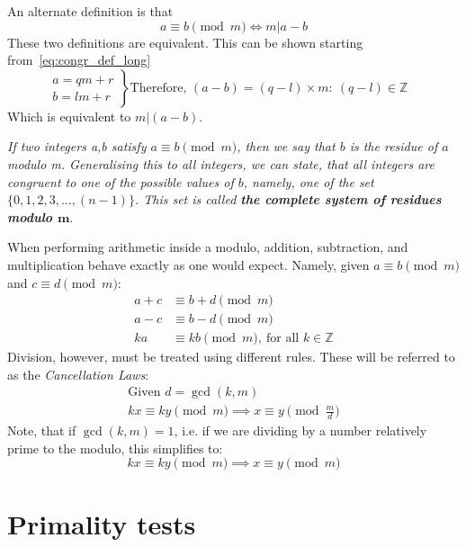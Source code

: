 \documentclass[12pt, titlepage]{article}
\let\oldsection\section
\renewcommand\section{\clearpage\oldsection}
\begin{document}
An alternate definition is that
%
\begin{equation*}
    a \equiv b \pmod{m} \iff m | a-b
\end{equation*}
%
These two definitions are equivalent. This can be shown starting
from~\eqref{eq:congr_def_long}
%
\begin{equation*}
    \left. 
        \begin{aligned}
            a = qm + r\\ 
            b = lm + r
        \end{aligned}
    \right\}
    \text{Therefore, } (a - b) = (q-l)\times m :\: (q-l) \in \mathbb{Z}\quad
\end{equation*}
%
Which is equivalent to $m | (a-b)$.

\textit{If two integers a,b satisfy $a \equiv b \pmod{m}$, then we say that $b$ is the residue of
$a$ modulo m. Generalising this to all integers, we can state, that all integers are
congruent to one of the possible values of $b$, namely, one of the set $\{0, 1, 2, 3, \ldots,
(n-1)\}$. This set is called \textbf{the complete system of residues modulo
$\mathbf{m}$}}. \autocite[85]{dence}

When performing arithmetic inside a modulo, addition, subtraction, and multiplication behave
exactly as one would expect. Namely, given
$a\equiv b\pmod{m}$ and $c\equiv d\pmod{m}$:
%
\begin{align*}
    a + c &\equiv b + d \pmod{m}\\
    a - c &\equiv b - d \pmod{m}\\
    ka 	  &\equiv kb \pmod{m},\ \text{for all } k \in \mathbb{Z}
\end{align*}
%
Division, however, must be treated using different rules. These will be referred to as the
\emph{Cancellation Laws}\autocite[280]{haese_ib_options}:
%
\begin{gather*}
    \text{Given } d = \gcd(k, m)\\
    kx \equiv ky \pmod{m} \implies x \equiv y \pmod{\frac{m}{d}}
\end{gather*}
%
Note, that if $\gcd(k, m) = 1$, i.e. if we are dividing by a number relatively prime to the
modulo, this simplifies to:
%
\begin{equation*}
    kx \equiv ky \pmod{m} \implies x \equiv y \pmod{m}
\end{equation*}
%

\section{Primality tests}
\end{document}
